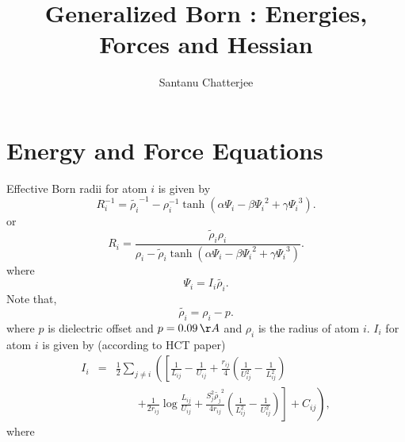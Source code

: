 \documentclass[12pt]{article}
\title{Generalized Born : Energies, Forces and Hessian}
\author{Santanu Chatterjee}
\date{}
\begin{document}
\maketitle

\section{Energy and Force Equations}

Effective Born radii for atom $i$ is given by
\begin{equation}
R_{i}^{-1} = \tilde{{\rho}_i}^{-1} - {\rho}_{i}^{-1}\tanh({\alpha}{\Psi_{i}}-{\beta}{\Psi_{i}}^{2} + {\gamma}{\Psi_{i}}^{3}).
\end{equation}
or
\begin{equation}
R_{i} = \frac{\tilde{\rho}_{i}{\rho}_{i}}{{\rho}_{i} - \tilde{\rho}_{i}\tanh({\alpha}{\Psi_{i}}-{\beta}{\Psi_{i}}^{2} + {\gamma}{\Psi_{i}}^{3})}.
\end{equation}
where 
\begin{equation}
\label{psiequation}
{\Psi}_{i} = I_{i}\tilde{{\rho}_i}.
\end{equation}
Note that, 
\begin{equation}
\tilde{{\rho}_i} = {\rho}_{i} - p.
\end{equation}
where $p$ is dielectric offset and $p=0.09{\,}\AA$ and ${\rho}_{i}$ is the
radius of atom $i$.
$I_{i}$ for atom $i$ is given by (according to HCT paper) 
\begin{eqnarray}
\label{burialterm}
I_{i} &=& \frac{1}{2}\displaystyle\sum_{j\ne i}\left(\left[\frac{1}{L_{ij}} - \frac{1}{U_{ij}} + \frac{r_{ij}}{4}\left(
  \frac{1}{U_{ij}^{2}} - \frac{1}{L_{ij}^{2}}\right) \right.\right. \nonumber \\
&& \qquad \left.\left.   + \frac{1}{2r_{ij}}\log{\frac{L_{ij}}{U_{ij}}} + 
   \frac{S_{j}^{2}\tilde{{\rho}_{j}}^{2}}{4r_{ij}}\left(\frac{1}{L_{ij}^{2}} - \frac{1}{U_{ij}^{2}}\right)\right] + C_{ij}\right),
\end{eqnarray}
where
\end{document}
